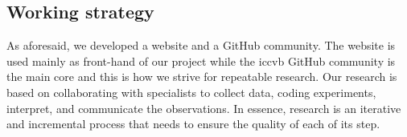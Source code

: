 \subsection{Working strategy}
As aforesaid, we developed a website and a GitHub community.
The website is used mainly as front-hand of our project while the \ac{iccvb} GitHub community is the main core and this is how we strive for repeatable research.
Our research is based on collaborating with specialists to collect data, coding experiments, interpret, and communicate the observations.
In essence, research is an iterative and incremental process that needs to ensure the quality of each of its step. 



